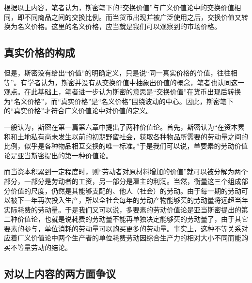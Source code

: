 根据以上内容，笔者认为，斯密笔下的“交换价值”与广义价值论中的交换价值相同，即不同商品之间的交换比例。而当货币出现并被广泛使用之后，交换价值又转换为名义价格。这里的名义价格，应当就是我们可以观察到的市场价格\cite[293]{YueSeFu*XiongBiTeJingJiFenXiShiDi1Juan2017}。

\subsection{真实价格的构成}

但是，斯密没有给出“价值”的明确定义，只是说“同一真实价格的价值，往往相等”\cite[28]{YaDang*SiMiGuoFuLun2015}。有学者认为，斯密并没有从交换价值中抽象出价值的概念\cite[71]{ChenDaiSunCongGuDianJingJiXuePaiDaoMaKeSiRuoGanZhuYaoXueShuoFaZhanLueLun2014}，笔者也认同这一观点。在此基础上，笔者进一步认为斯密的意思是“交换价值”在货币出现后转换为“名义价格”，而“真实价格”是“名义价格”围绕波动的中心\cite[52]{YaDang*SiMiGuoFuLun2015}。因此，斯密笔下的“真实价格”才符合广义价值论中对价值的定义。

一般认为，斯密在第一篇第六章中提出了两种价值论\cite[97]{YanZhiJieXiFangJingJiXueShuoShiJiaoChengDiErBan2013}\cite[126]{CaiJiMingCongGuDianZhengZhiJingJiXueDaoZhongGuoTeSeSheHuiZhuYiZhengZhiJingJiXueJiYuZhongGuoShiJiaoDeZhengZhiJingJiXueYanBianShangCe2023}。首先，斯密认为“在资本累积和土地私有尚未发生以前的初期野蛮社会，获取各种物品所需要的劳动量之间的比例，似乎是各种物品相互交换的唯一标准。”\cite[41]{YaDang*SiMiGuoFuLun2015}于是我们可以说，单要素的劳动价值论是亚当斯密提出的第一种价值论。

而当资本积累到一定程度时，则“劳动者对原材料增加的价值”就可以被分解为两个部分，一部分是劳动者的工资，另一部分是雇主的利润\cite[42]{YaDang*SiMiGuoFuLun2015}。当然，衡量这三个组成部分价值的尺度，仍然是其能够支配的、他人（社会）的劳动\cite[43-44]{YaDang*SiMiGuoFuLun2015}。由于每一期的劳动可以被下一年再次投入生产，所以全社会每年的劳动产物能够买的劳动量将远超当年实际耗费的劳动量\cite[48]{YaDang*SiMiGuoFuLun2015}。于是我们又可以说，多要素的劳动价值论是亚当斯密提出的第二种价值论，也就是说耗费的劳动量不能再单独决定能够买的劳动量了，由于其它要素的参与，单位消耗的劳动量可以购买更多的劳动量\cite[138]{CaiJiMingCongGuDianDaoXianDaiZhengZhiJingJiXueGaiNianDeYanBianJianPingXinZhengZhiJingJiXueDeFaZhan2012}。事实上，这种不等关系对应着广义价值论中两个生产者的单位耗费劳动因综合生产力的相对大小不同而能购买不等量劳动的结论\cite[294]{CaiJiMingCongGuDianZhengZhiJingJiXueDaoZhongGuoTeSeSheHuiZhuYiZhengZhiJingJiXueJiYuZhongGuoShiJiaoDeZhengZhiJingJiXueYanBianShangCe2023}。

\subsection{对以上内容的两方面争议}

